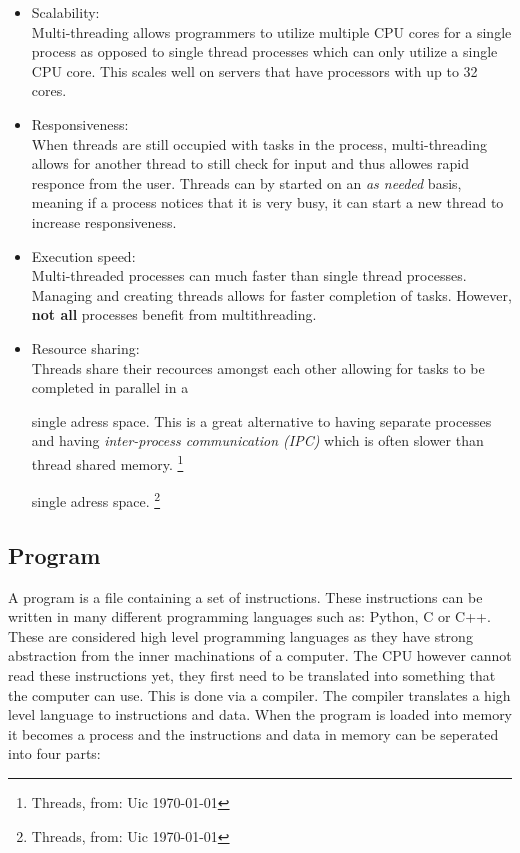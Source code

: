 \begin{itemize}
\item Scalability: \\

Multi-threading allows programmers to utilize multiple CPU cores for a single process as opposed to single
thread processes which can only utilize a single CPU core. This scales well on servers that have processors
with up to 32 cores.

\item Responsiveness: \\

When threads are still occupied with tasks in the process, multi-threading allows for another thread
to still check for input and thus allowes rapid responce from the user. Threads can by started on an
		\textit{as needed} basis, meaning if a process notices that it is very busy, it can start
		a new thread to increase responsiveness.

\item Execution speed: \\

Multi-threaded processes can much faster than single thread processes. Managing and creating threads allows for
		faster completion of tasks. However, \textbf{not all} processes benefit from multithreading. 

\item Resource sharing: \\

Threads share their recources amongst each other allowing for tasks to be completed in parallel in a

		single adress space. This is a great alternative to having separate processes and having \textit{inter-process communication (IPC)}
		which is often slower than thread shared memory.
		\footnote{Threads, from: Uic \today }

single adress space. \footnote{Threads, from: Uic \today }


\end{itemize}

\subsection{Program}

A program is a file containing a set of instructions. These instructions can be written in many different 
programming languages such as: Python, C or C++. These are considered high level programming languages as 
they have strong abstraction from the inner machinations of a computer. The CPU however cannot read these 
instructions yet, they first need to be translated into something that the computer can use. This is done 
via a compiler. The compiler translates a high level language to instructions and data. When the program is
loaded into memory it becomes a process and the instructions and data in memory can be seperated into four parts:

